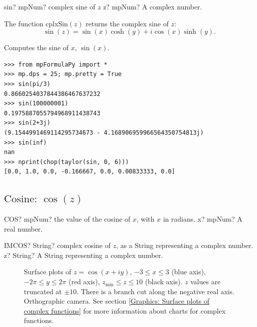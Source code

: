 \begin{mpFunctionsExtract}
	\mpFunctionOne
	{sin? mpNum? complex sine of $z$}
	{z? mpNum? A complex number.}
\end{mpFunctionsExtract}

\vspace{0.3cm}
The function \textsf{cplxSin$(z)$} returns the complex sine of $z$: 
\begin{equation}
	\sin(z) = \sin(x) \cosh(y) + i \cos(x) \sinh(y).
\end{equation}


Computes the sine of $x$, $\sin(x)$.
\begin{lstlisting}
>>> from mpFormulaPy import *
>>> mp.dps = 25; mp.pretty = True
>>> sin(pi/3)
0.8660254037844386467637232
>>> sin(100000001)
0.1975887055794968911438743
>>> sin(2+3j)
(9.1544991469114295734673 - 4.168906959966564350754813j)
>>> sin(inf)
nan
>>> nprint(chop(taylor(sin, 0, 6)))
[0.0, 1.0, 0.0, -0.166667, 0.0, 0.00833333, 0.0]
\end{lstlisting}




\newpage
\subsection{\texorpdfstring{$\text{Cosine: }\cos(z)$}{cos}}

\begin{mpFunctionsExtract}
	\mpWorksheetFunctionOneNotImplemented
	{COS? mpNum? the value of the cosine of $x$, with $x$ in radians.}
	{x? mpNum? A real number.}
\end{mpFunctionsExtract}

\vspace{0.6cm}
\begin{mpFunctionsExtract}
	\mpWorksheetFunctionOneNotImplemented
	{IMCOS? String? complex cosine of $z$, as a String representing a complex number.}
	{z? String? A String representing a complex number.}
\end{mpFunctionsExtract}


\begin{figure}[ht]%
	\centering
	\qquad
	\caption[Complex Cosine]{Surface plots of $z = \cos(x + iy)$, $-3 \leq x \leq 3$ (blue axis), $-2 \pi \leq y \leq 2\pi$ (red axis), $z_{\text{min}} \leq z \leq 10$ (black axis). $z$ values are truncated at $\pm 10$. There is a branch cut along the negative real axis. Orthographic camera. See section \ref{Graphics: Surface plots of complex functions} for more information about charts for complex functions.} 
	\label{fig:Complex Cosine}%
\end{figure}


